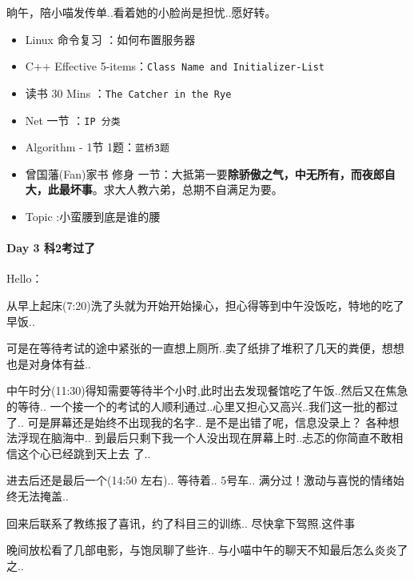 \documentclass[UTF8,a4paper,8pt]{ctexart}
\begin{document}
	 	 晌午，陪小喵发传单..看着她的小脸尚是担忧..愿好转。
	 	 \begin{itemize}[itemindent = 1em]
	 	 	\renewcommand\labelitemi{\makebox[0pt][l]{$\square$}\raisebox{.15ex}{\hspace{0.1em}$\checkmark$}}
	 	 	\item   Linux 命令复习 ：如何布置服务器
	 	 	\item   C++ Effective 5-items：\verb|Class Name and Initializer-List|
	 	 	
	 	 	\item   读书  30 Mins	：\verb|The Catcher in the Rye	| 
	 	 	\item   Net 一节 ：\verb|IP 分类|	
	 	 	\item   Algorithm - 1节 1题：\verb|蓝桥3题|
	 	 	
	 	 	\renewcommand\labelitemi{\makebox[0pt][l]{$\square$}\raisebox{.15ex}{\hspace{0.1em}$\checkmark$}}
	 	 	\item  曾国藩(Fan)家书 修身 一节：大抵第一要\textbf{除骄傲之气，中无所有，而夜郎自大，此最坏事}。求大人教六弟，总期不自满足为要。
	 	 	\item   Topic :小蛮腰到底是谁的腰
	 	 \end{itemize}
 	 \paragraph{Day 3  科2考过了    \quad     }
	 	  Hello：
	 	  
	 	  从早上起床(7:20)洗了头就为开始开始操心，担心得等到中午没饭吃，特地的吃了早饭..
	 	  
	 	  可是在等待考试的途中紧张的一直想上厕所..卖了纸排了堆积了几天的粪便，想想也是对身体有益..
	 	  
	 	  中午时分(11:30)得知需要等待半个小时,此时出去发现餐馆吃了午饭..然后又在焦急的等待.. 一个接一个的考试的人顺利通过..心里又担心又高兴..我们这一批的都过了..  可是屏幕还是始终不出现我的名字.. 是不是出错了呢，信息没录上？ 各种想法浮现在脑海中.. 到最后只剩下我一个人没出现在屏幕上时..忐忑的你简直不敢相信这个心已经跳到天上去 了..
	 	  
	 	  进去后还是最后一个(14:50 左右).. 等待着.. 5号车.. 满分过！激动与喜悦的情绪始终无法掩盖..
	 	  
	 	  回来后联系了教练报了喜讯，约了科目三的训练.. 尽快拿下驾照.这件事
	 	  
	 	  晚间放松看了几部电影，与饱凤聊了些许.. 与小喵中午的聊天不知最后怎么炎炎了之..
	 	  
\end{document}
